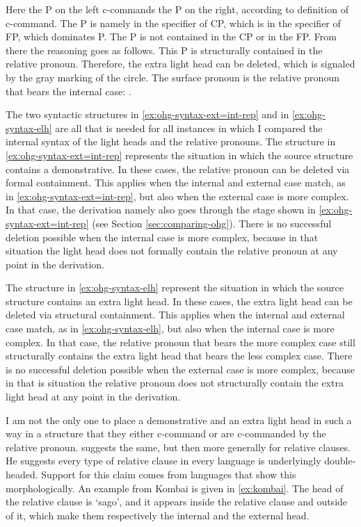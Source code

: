 Here the P on the left c-commands the P on the right, according to  definition of c-command.
The P is namely in the specifier of CP, which is in the specifier of FP, which dominates P. The P is not contained in the CP or in the FP.
From there the reasoning goes as follows.
This P is structurally contained in the relative pronoun. Therefore, the extra light head can be deleted, which is signaled by the gray marking of the circle.
The surface pronoun is the relative pronoun that bears the internal case: .

The two syntactic structures in \ref{ex:ohg-syntax-ext=int-rep} and in \ref{ex:ohg-syntax-elh} are all that is needed for all instances in which I compared the internal syntax of the light heads and the relative pronouns.
The structure in \ref{ex:ohg-syntax-ext=int-rep} represents the situation in which the source structure contains a demonstrative. In these cases, the relative pronoun can be deleted via formal containment.
This applies when the internal and external case match, as in \ref{ex:ohg-syntax-ext=int-rep}, but also when the external case is more complex.
In that case, the derivation namely also goes through the stage shown in \ref{ex:ohg-syntax-ext=int-rep} (see Section \ref{sec:comparing-ohg}).
There is no successful deletion possible when the internal case is more complex, because in that situation the light head does not formally contain the relative pronoun at any point in the derivation.

The structure in \ref{ex:ohg-syntax-elh} represent the situation in which the source structure contains an extra light head. In these cases, the extra light head can be deleted via structural containment.
This applies when the internal and external case match, as in \ref{ex:ohg-syntax-elh}, but also when the internal case is more complex.
In that case, the relative pronoun that bears the more complex case still structurally contains the extra light head that bears the less complex case.
There is no successful deletion possible when the external case is more complex, because in that is situation the relative pronoun does not structurally contain the extra light head at any point in the derivation.

I am not the only one to place a demonstrative and an extra light head in such a way in a structure that they either c-command or are c-commanded by the relative pronoun. \citet{cinqueforthcoming} suggests the same, but then more generally for relative clauses. He suggests every type of relative clause in every language is underlyingly double-headed. Support for this claim comes from languages that show this morphologically. An example from Kombai is given in \ref{ex:kombai}. The head of the relative clause is  `sago', and it appears inside the relative clause and outside of it, which make them respectively the internal and the external head.

